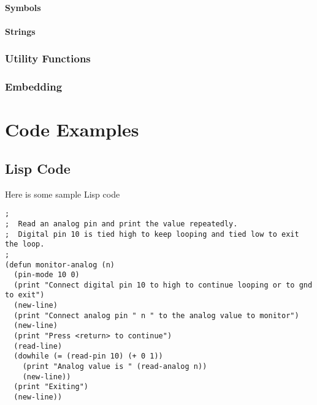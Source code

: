 \documentclass[10pt, openany]{book}
\begin{document}
\subsubsection{Symbols}

\subsubsection{Strings}

\subsection{Utility Functions}
\subsection{Embedding}


\chapter{Code Examples}
\section{Lisp Code}
Here is some sample Lisp code

\lstset{language=lisp}
\begin{lstlisting}
;
;  Read an analog pin and print the value repeatedly.
;  Digital pin 10 is tied high to keep looping and tied low to exit the loop.
;
(defun monitor-analog (n)
  (pin-mode 10 0)
  (print "Connect digital pin 10 to high to continue looping or to gnd to exit")
  (new-line)
  (print "Connect analog pin " n " to the analog value to monitor")
  (new-line)
  (print "Press <return> to continue")
  (read-line)
  (dowhile (= (read-pin 10) (+ 0 1))
    (print "Analog value is " (read-analog n))
    (new-line))
  (print "Exiting")
  (new-line))
\end{lstlisting}
\end{document}
